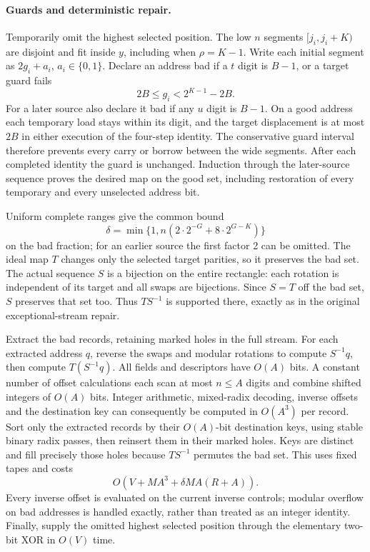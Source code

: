 \paragraph{Guards and deterministic repair.}
Temporarily omit the highest selected position. The low $n$ segments
$[j_i,j_i+K)$ are disjoint and fit inside $y$, including when $\rho=K-1$.
Write each initial segment as $2g_i+a_i$, $a_i\in\{0,1\}$.
Declare an address bad if a $t$ digit is $B-1$, or a target guard fails
\[
 2B\le g_i<2^{K-1}-2B.
\]
For a later source also declare it bad if any $u$ digit is $B-1$.
On a good address each temporary load stays within its digit, and the target
displacement is at most $2B$ in either execution of the four-step identity.
The conservative guard interval therefore prevents every carry or borrow
between the wide segments. After each completed identity the guard is
unchanged. Induction through the later-source sequence proves the desired
map on the good set, including restoration of every temporary and every
unselected address bit.

Uniform complete ranges give the common bound
\[
 \delta=\min\{1,n(2\cdot2^{-G}+8\cdot2^{G-K})\}
\]
on the bad fraction; for an earlier source the first factor 2 can be omitted.
The ideal map $T$ changes only the selected target parities, so it preserves
the bad set. The actual sequence $S$ is a bijection on the entire rectangle:
each rotation is independent of its target and all swaps are bijections.
Since $S=T$ off the bad set, $S$ preserves that set too. Thus $TS^{-1}$ is
supported there, exactly as in the original exceptional-stream repair.

Extract the bad records, retaining marked holes in the full stream. For each
extracted address $q$, reverse the swaps and modular rotations to compute
$S^{-1}q$, then compute $T(S^{-1}q)$. All fields and descriptors have $O(A)$
bits. A constant number of offset calculations each scan at most $n\le A$
digits and combine shifted integers of $O(A)$ bits. Integer arithmetic,
mixed-radix decoding, inverse offsets and the destination key can consequently
be computed in $O(A^3)$ per record. Sort only the extracted records by their
$O(A)$-bit destination keys, using stable binary radix passes, then reinsert
them in their marked holes. Keys are distinct and fill precisely those holes
because $TS^{-1}$ permutes the bad set. This uses fixed tapes and costs
\[
 O(V+MA^3+\delta MA(R+A)).
\]
Every inverse offset is evaluated on the current inverse controls; modular
overflow on bad addresses is handled exactly, rather than treated as an
integer identity. Finally, supply the omitted highest selected position
through the elementary two-bit XOR in $O(V)$ time.

